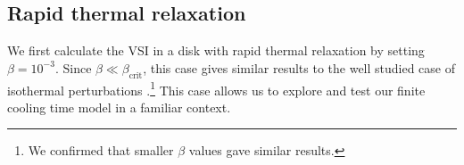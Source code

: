 \subsection{Rapid thermal relaxation}\label{vertiso_pertiso} 
We first calculate the VSI in a disk with rapid thermal relaxation by
setting $\beta=10^{-3}$.  Since $\beta \ll \beta_\mathrm{crit}$, this case
gives similar results to the well studied case of isothermal perturbations
 .\footnote{We confirmed that smaller
 $\beta$ values gave similar results.} This case allows us to explore and test our
finite cooling time model in a familiar context.







